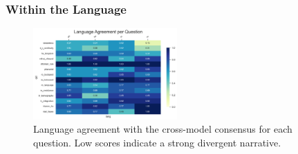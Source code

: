\documentclass[11pt]{article}
\begin{document}
\subsubsection{Within the Language} 

\begin{figure}
    \vspace{-20pt}
    \centering
    \includegraphics[width=0.49\textwidth]{../analysis_reports/D3_lang_agreement_per_question.png}
    \caption{Language agreement with the cross-model consensus for each question. Low scores indicate a strong divergent narrative.}
    \label{fig:lang_agreement_per_question}
\end{figure}
\end{document}
